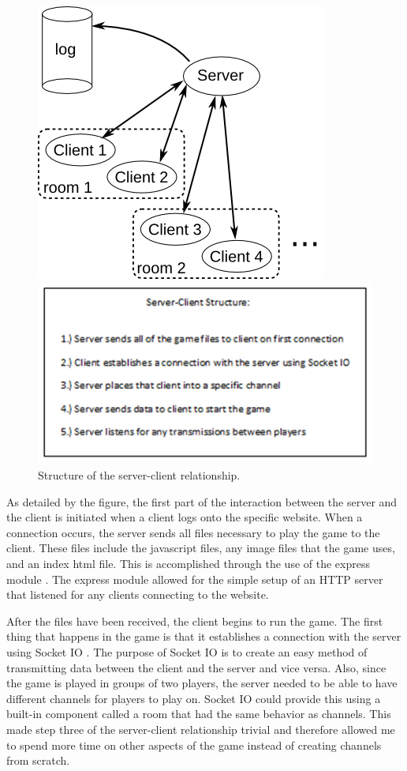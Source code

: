 \begin{figure}
\parbox[t]{0.5\columnwidth}{
\vspace{0pt}\includegraphics[width=0.5\columnwidth]{client-server.png}
}\hspace{-0.5cm}
\parbox[t]{0.5\columnwidth}{
\vspace{0pt}\includegraphics[width=0.55\columnwidth]{server.png}
}
\caption{Structure of the server-client
  relationship.}
\label{fig:server-client}
\end{figure}

As detailed by the figure, the first part of the interaction between
the server and the client is initiated when a client logs onto the
specific website. When a connection occurs, the server sends all files
necessary to play the game to the client.  These files include the
javascript files, any image files that the game uses, and an index
html file. This is accomplished through the use of the express module
\cite{express}. The express module allowed for the simple setup of an
HTTP server that listened for any clients connecting to the website.

After the files have been received, the client begins to run the
game. The first thing that happens in the game is that it establishes
a connection with the server using Socket IO \cite{socketIO}. The
purpose of Socket IO is to create an easy method of transmitting data
between the client and the server and vice versa. Also, since the game
is played in groups of two players, the server needed to be able to
have different channels for players to play on. Socket IO could
provide this using a built-in component called a room that had the
same behavior as channels. This made step three of the server-client
relationship trivial and therefore allowed me to spend more time on
other aspects of the game instead of creating channels from scratch.

